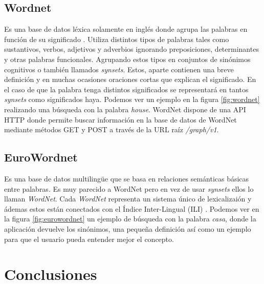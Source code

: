 \subsection{Wordnet}
\label{cap:subsec:wordnet}
Es una base de datos léxica solamente en inglés donde agrupa las palabras en función de su significado \citep{wordnet2010}. Utiliza distintos tipos de palabras tales como sustantivos, verbos, adjetivos y adverbios ignorando preposiciones, determinantes y otras palabras funcionales. Agrupando estos tipos en conjuntos de sinónimos cognitivos o también llamados \textit{synsets}. Estos, aparte contienen una breve definición y en muchas ocasiones oraciones cortas que explican el significado. En el caso de que la palabra tenga distintos significados se representará en tantos \textit{synsets} como significados haya. Podemos ver un ejemplo en la figura \ref{fig:wordnet} realizando una búsqueda con la palabra \textit{house}.
WordNet dispone de una API HTTP donde permite buscar información en la base de datos de WordNet mediante métodos GET y POST a través de la URL raíz \textit{/graph/v1}.


\subsection{EuroWordnet}
\label{cap:subsec:eurowordnet}
Es una base de datos multilingüe que se basa en relaciones semánticas básicas entre palabras. Es muy parecido a WordNet pero en vez de usar \textit{synsets} ellos lo llaman \textit{WordNet}. Cada \textit{WordNet} representa un sistema único de lexicalizaión y ádemas estos están conectados con el Índice Inter-Lingual (ILI) \citep{wiki:eurowordnet2017}.
Podemos ver en la figura \ref{fig:eurowordnet} un ejemplo de búsqueda con la palabra  \textit{casa}, donde la aplicación devuelve los sinónimos, una pequeña definición así como un ejemplo para que el usuario pueda entender mejor el concepto.

\section{Conclusiones}


